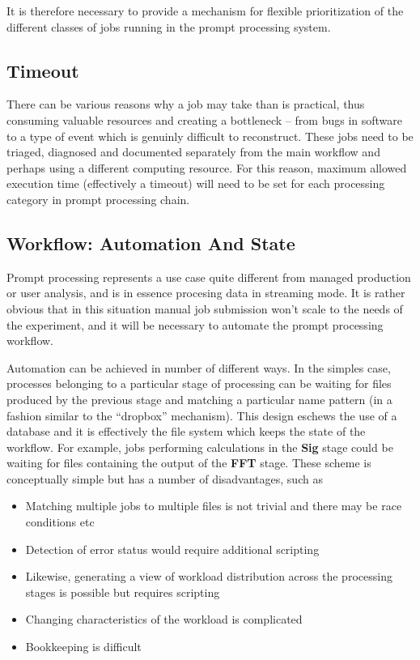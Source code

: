 \documentclass[pdftex,12pt,letter]{article}
\begin{document}
It is therefore necessary to provide a mechanism for flexible prioritization of the different
classes of jobs running in the prompt processing system.

\subsection{Timeout}
There can be various reasons why a job may take than is practical, thus consuming valuable resources
and creating a bottleneck -- from bugs in software to a type of event which is genuinly difficult to reconstruct.
These jobs need to be triaged, diagnosed and documented separately from the main workflow and perhaps
using a different computing resource. For this reason, maximum allowed execution time (effectively a timeout)
will need to be set for each processing category in prompt processing chain.


\subsection{Workflow: Automation And State}

Prompt processing represents a use case quite different from managed production or user analysis, and is 
in essence procesing data in streaming mode. It is rather obvious that in this situation manual job submission won't scale to the
needs of the experiment, and it will be necessary to automate the prompt processing workflow.

Automation can be achieved in  number of different ways. In the simples case, processes belonging to a particular stage
of processing can be waiting for files produced by the previous stage and matching a particular name pattern
(in a fashion similar to the ``dropbox'' mechanism). This design eschews the use of a database and it is effectively
the file system which keeps the state of the workflow. For example, jobs performing calculations in the \textbf{Sig}
stage could be waiting for files containing the output of the \textbf{FFT} stage. These scheme is conceptually simple but has a number of
disadvantages, such as
\begin{itemize}
\item Matching multiple jobs to multiple files is not trivial and there may be race conditions etc
\item Detection of error status would require additional scripting
\item Likewise, generating a view of workload distribution across the processing stages is possible but requires
scripting
\item Changing characteristics of the workload is complicated
\item Bookkeeping is difficult
\end{itemize}
\end{document}
